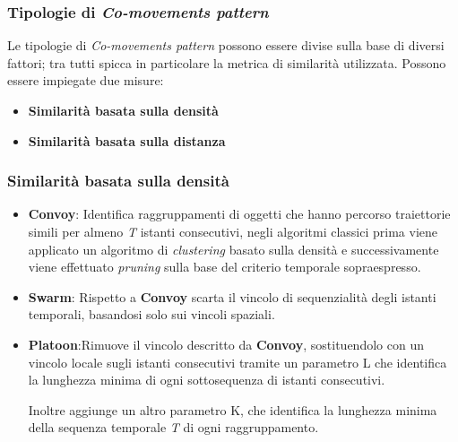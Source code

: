 \documentclass{beamer}
\begin{document}
\begin{frame}

\frametitle{Tipologie di \textit{Co-movements pattern}}

Le tipologie di \textit{Co-movements pattern} possono essere divise sulla base di diversi fattori; 
tra tutti spicca in particolare la metrica di similarità utilizzata. 
Possono essere impiegate due misure:

\begin{itemize}

\item \textbf{Similarità basata sulla densità}

\item \textbf{Similarità basata sulla distanza}

\end{itemize}

\end{frame}

\begin{frame}

\frametitle{Similarità basata sulla densità}

\begin{itemize}

\item \textbf{Convoy}: Identifica raggruppamenti di oggetti che hanno percorso traiettorie simili per almeno \textit{T} istanti consecutivi, negli algoritmi classici prima viene applicato un algoritmo di \textit{clustering} basato sulla densità e successivamente viene effettuato \textit{pruning} sulla base del criterio temporale sopraespresso.

\item \textbf{Swarm}: Rispetto a \textbf{Convoy} scarta il vincolo di sequenzialità degli istanti temporali, basandosi solo sui vincoli spaziali.

\item \textbf{Platoon}:Rimuove il vincolo descritto da \textbf{Convoy}, sostituendolo con un vincolo locale sugli istanti consecutivi
tramite un parametro L che identifica la lunghezza 
minima di ogni sottosequenza di istanti consecutivi.

Inoltre aggiunge un altro parametro K, che identifica la lunghezza minima della sequenza temporale \textit{T} di ogni raggruppamento.

  

\end{itemize}

\end{frame}
\end{document}
